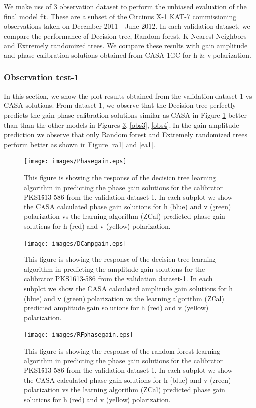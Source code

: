 We make use of 3 observation dataset to perform the unbiased evaluation of the final model fit. These are a subset of the Circinus X-1 KAT-7 commissioning observations taken on December 2011 - June 2012. In each validation dataset, we compare the performance of Decision tree, Random forest, K-Nearest Neighbors and Extremely randomized trees. We compare these results with gain amplitude and phase calibration solutions obtained from CASA 1GC for h $\&$ v polarization. 

\subsubsection{Observation test-1}
In this section, we show the plot results obtained from the validation dataset-1 vs CASA solutions. From dataset-1, we observe that the Decision tree perfectly predicts the gain phase calibration solutions similar as CASA in Figure \ref{obs1} better than than the other models in Figures \ref{obs2}, \ref{obs3}, \ref{obs4}. In the gain amplitude prediction we observe that only Random forest and Extremely randomized trees perform better as shown in Figure \ref{ra1} and \ref{ea1}. 

 \begin{figure}[H]
    \texttt{[image: images/Phasegain.eps]}
    \caption{This figure is showing the response of the decision tree learning algorithm in predicting the phase gain solutions for the calibrator PKS1613-586 from the validation dataset-1. In each subplot we show the CASA calculated phase gain solutions for h (blue) and v (green) polarization vs the learning algorithm (ZCal) predicted phase gain solutions for h (red) and v (yellow) polarization.}
    \label{obs1}
\end{figure}

\begin{figure}[H]
    \texttt{[image: images/DCampgain.eps]}
    \caption{This figure is showing the response of the decision tree learning algorithm in predicting the amplitude gain solutions for the calibrator PKS1613-586 from the validation dataset-1. In each subplot we show the CASA calculated amplitude gain solutions for h (blue) and v (green) polarization vs the learning algorithm (ZCal) predicted amplitude gain solutions for h (red) and v (yellow) polarization.}
     \label{da1}
\end{figure}


\begin{figure}[H]
    \texttt{[image: images/RFphasegain.eps]}
    \caption{This figure is showing the response of the random forest learning algorithm in predicting the phase gain solutions for the calibrator PKS1613-586 from the validation dataset-1. In each subplot we show the CASA calculated phase gain solutions for h (blue) and v (green) polarization vs the learning algorithm (ZCal) predicted phase gain solutions for h (red) and v (yellow) polarization.}
    \label{obs2}
\end{figure}

